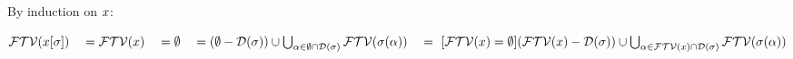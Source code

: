 By induction on $x$:

\begin{bycase}

\Case{$\bool$, $\var$}
\begin{links}
$\mathcal{FTV}(x[\sigma])
 \\\hspace*{1em}=\\
 \mathcal{FTV}(x)
 \\\hspace*{1em}=\\
 \emptyset
 \\\hspace*{1em}=\\
 (\emptyset-\mathcal{D}(\sigma))\cup
 \bigcup_{\alpha\in\emptyset\cap\mathcal{D}(\sigma)}{\mathcal{FTV}(\sigma(\alpha))}
 \\\hspace*{1em}=\ [\mbox{$\mathcal{FTV}(x)=\emptyset$}]\\
 (\mathcal{FTV}(x)-\mathcal{D}(\sigma))\cup
 \bigcup_{\alpha\in\mathcal{FTV}(x)\cap\mathcal{D}(\sigma)}{\mathcal{FTV}(\sigma(\alpha))}$
\end{links}


\end{bycase}
